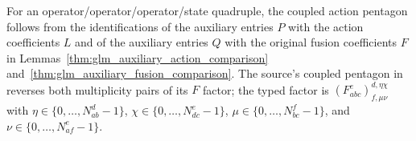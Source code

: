 For an operator/operator/operator/state quadruple, the coupled action
pentagon follows from the identifications of the auxiliary entries $P$
with the action coefficients $L$ and of the auxiliary entries $Q$ with the
original fusion coefficients $F$ in
Lemmas~\ref{thm:glm_auxiliary_action_comparison}
and~\ref{thm:glm_auxiliary_fusion_comparison}.
The source's coupled pentagon in \cite[Section~3]{GarreRubio2023MPOSym}
reverses both multiplicity pairs of its $F$ factor; the typed factor is
$(F_{abc}^{e})_{f,\mu\nu}^{d,\eta\chi}$ with
$\eta\in\{0,\ldots,N_{ab}^{d}-1\}$,
$\chi\in\{0,\ldots,N_{dc}^{e}-1\}$,
$\mu\in\{0,\ldots,N_{bc}^{f}-1\}$, and
$\nu\in\{0,\ldots,N_{af}^{e}-1\}$.
